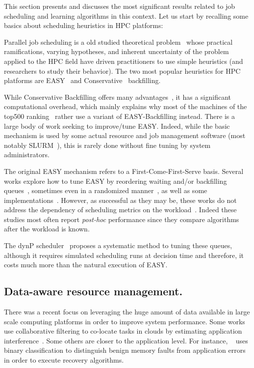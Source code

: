 \documentclass[sigconf,anonymous]{acmart}
\begin{document}
This section presents and discusses the most significant results related to job
scheduling and learning algorithms in this context.  Let us start by recalling
some basics about scheduling heuristics in HPC platforms:

Parallel job scheduling is a old studied theoretical
problem~\cite{Frachtenberg:2009:JSS:1692356,Feitelson:2004:PJS:2128864.2128865}
whose practical ramifications, varying hypotheses, and inherent uncertainty of
the problem applied to the HPC field have driven practitioners to use simple
heuristics (and researchers to study their behavior). The two most popular
heuristics for HPC platforms are EASY~\cite{easy} and
Conservative~\cite{Mu'alem:2001:UPW:380314.380315} backfilling.

While Conservative Backfilling offers many advantages~\cite{bfchar}, it has a
significant computational overhead, which mainly explains why most of the
machines of the top500 ranking~\cite{top500} rather use a variant of EASY-Backfilling
instead.  There is a large body of work seeking to improve/tune EASY. Indeed,
while the basic mechanism is used by some actual resource and job management
software (most notably SLURM~\cite{SLURMdocSCHED}), this is rarely done
without fine tuning by system administrators.

The original EASY mechanism refers to a First-Come-First-Serve basis.  Several
works explore how to tune EASY by reordering waiting and/or backfilling
queues~\cite{Tsafrir_easypp_2005}, sometimes even in a randomized
manner~\cite{1592720}, as well as some implementations~\cite{Jackson2001}.
However, as successful as they may be, these works do not address the
dependency of scheduling metrics on the workload~\cite{variability}. Indeed
these studies most often report \textit{post-hoc} performance since they
compare algorithms after the workload is known.

The dynP scheduler~\cite{streit_selftuning_2002} proposes a systematic
method to tuning these queues, although it requires simulated scheduling runs
at decision time and therefore, it costs much more than the natural execution of EASY.

\subsection{Data-aware resource management.}

There was a recent focus on leveraging the huge amount of data available in
large scale computing platforms in order to improve system performance. Some
works use collaborative filtering to co-locate tasks in clouds by estimating
application interference~\cite{7516031}. Some others are closer to the
application level. For instance, ~\cite{fmodeling} uses binary classification
to distinguish benign memory faults from application errors in order to execute
recovery algorithms.
\end{document}
